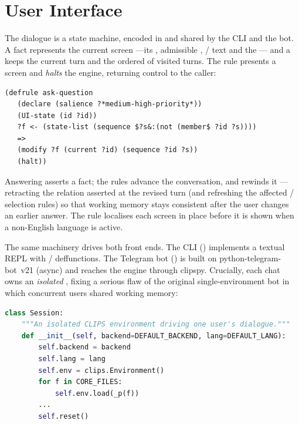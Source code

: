 \section{User Interface}
\label{sec:ui}

The dialogue is a state machine, encoded in  and shared by the
CLI and the bot. A  fact represents the current screen ---its
, admissible , / text and
the --- and a  keeps the current turn
and the ordered  of visited turns. The  rule
presents a screen and \emph{halts} the engine, returning control to the caller:

\begin{lstlisting}
(defrule ask-question
   (declare (salience ?*medium-high-priority*))
   (UI-state (id ?id))
   ?f <- (state-list (sequence $?s&:(not (member$ ?id ?s))))
   =>
   (modify ?f (current ?id) (sequence ?id ?s))
   (halt))
\end{lstlisting}

Answering asserts a  fact; the 
rules advance the conversation, and  rewinds it ---retracting
the relation asserted at the revised turn (and refreshing the affected
 / selection rules) so that working memory stays
consistent after the user changes an earlier answer. The 
rule localises each screen in place before it is shown when a non-English
language is active.

The same machinery drives both front ends. The CLI ()
implements a textual REPL with /
deffunctions. The Telegram bot () is built on
python-telegram-bot~v21 (async) and reaches the engine through clipspy. Crucially,
each chat owns an \emph{isolated} , fixing a serious flaw
of the original single-environment bot in which concurrent users shared working
memory:

\begin{lstlisting}[language=Python,numbers=none]
class Session:
    """An isolated CLIPS environment driving one user's dialogue."""
    def __init__(self, backend=DEFAULT_BACKEND, lang=DEFAULT_LANG):
        self.backend = backend
        self.lang = lang
        self.env = clips.Environment()
        for f in CORE_FILES:
            self.env.load(_p(f))
        ...
        self.reset()
\end{lstlisting}

